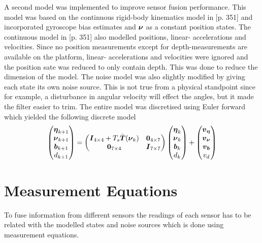 A second model was implemented to improve sensor fusion performance. This model was based on the continuous rigid-body kinematics model in \citet{sensorfusion}[p. 351] and incorporated gyroscope bias estimates and $\boldsymbol{\nu}$ as a constant position states. The continuous model in \citet{sensorfusion}[p. 351] also modelled positions, linear- accelerations and velocities. Since no position measurements except for depth-measurements are available on the \abbrROV platform, linear- accelerations and velocities were ignored and the position sate was reduced to only contain depth. This was done to reduce the dimension of the model. The noise model was also slightly modified by giving each state its own noise source. This is not true from a physical standpoint since for example, a disturbance in angular velocity will effect the angles, but it made the filter easier to trim. The entire model was discretised using Euler forward which yielded the following discrete model
\begin{equation}\label{eq:expanded_model}
\begin{pmatrix}
\boldsymbol{\eta}_{k+1}\\
\boldsymbol{\nu}_{k+1}\\
\boldsymbol{b}_{k+1}\\
d_{k+1}
\end{pmatrix}=
\begin{pmatrix}
\boldsymbol{I}_{4\times4} + T_s \bar{\boldsymbol{T}}(\boldsymbol{\nu}_{k})& \boldsymbol{0}_{4\times7}\\
\boldsymbol{0}_{7\times4} & \boldsymbol{I}_{7\times7}\\
\end{pmatrix}
\begin{pmatrix}
\boldsymbol{\eta}_{k}\\
\boldsymbol{\nu}_{k}\\
\boldsymbol{b}_{k}\\
d_{k}
\end{pmatrix}
+\begin{pmatrix}
  \boldsymbol{v}_{\boldsymbol{\eta}}\\
  \boldsymbol{v}_{\boldsymbol{\nu}}\\
  \boldsymbol{v}_{\boldsymbol{b}}\\
  v_d 
\end{pmatrix}
\end{equation}

\section{Measurement Equations}
To fuse information from different sensors the readings of each sensor has to be related with the modelled states and noise sources which is done using measurement equations.

